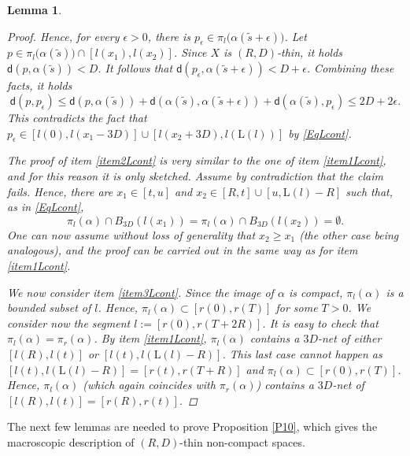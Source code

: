 \documentclass[10pt]{article}
\newtheorem{lemma}[thm]{Lemma}
\theoremstyle{definition}
\newcommand{\length}{\mathrm{L}}
\newcommand{\sd}{\mathsf{d}}
\begin{document}
\begin{lemma}
\begin{proof}
Hence, for every $\epsilon>0$, there is $p_\epsilon \in \pi_l\big(\alpha(\tilde{s}+\epsilon) \big)$.  Let $p \in \pi_l\big(\alpha(\tilde{s}) \big) \cap [l(x_1),l(x_2)]$. Since $X$ is $(R,D)$-thin, it holds $\sd(p,\alpha(\tilde{s}))<D$. It follows that $\sd(p_\epsilon,\alpha(\tilde{s}+\epsilon))<D+\epsilon$. Combining these facts, it holds
\[
\sd(p,p_\epsilon) \leq \sd(p,\alpha(\tilde{s}))+\sd(\alpha(\tilde{s}),\alpha(\tilde{s}+\epsilon))+\sd(\alpha(\tilde{s}),p_\epsilon) \leq 2D+2\epsilon.
\]
This contradicts the fact that $p_\epsilon \in [l(0),l(x_1-3D)] \cup [l(x_2+3D),l(\length(l))]$ by \eqref{EqLcont}. 

The proof of item \ref{item2Lcont} is very similar to the one of item \ref{item1Lcont}, and for this reason it is only sketched.
Assume by contradiction that the claim fails. Hence, there are $x_1 \in [t,u]$ and $x_2 \in [R,t] \cup [u,\length(l)-R]$ such that, as in \eqref{EqLcont},
            \begin{equation*} 
            \pi_l(\alpha) \cap B_{3D}(l(x_1))=\pi_l(\alpha) \cap B_{3D}(l(x_2))=\emptyset.
            \end{equation*}
One can now assume without loss of generality that $x_2 \geq x_1$ (the other case being analogous), and the proof can be carried out in the same way as for item \ref{item1Lcont}.

We now consider item \ref{item3Lcont}. Since the image of $\alpha$ is compact, $\pi_l(\alpha)$ is a bounded subset of $l$. Hence, $\pi_l(\alpha) \subset [r(0),r(T)]$ for some $T>0$. We consider now the segment $l:=[r(0),r(T+2R)]$. It is easy to check that $\pi_l(\alpha)=\pi_r(\alpha)$. By item \ref{item1Lcont}, $\pi_l(\alpha)$ contains a $3D$-net of either $[l(R),l(t)]$ or $[l(t),l(\length(l)-R)]$. This last case cannot happen as 
$[l(t),l(\length(l)-R)]=[r(t),r(T+R)]$ and $\pi_l(\alpha) \subset [r(0),r(T)]$. Hence, $\pi_l(\alpha)$ (which again coincides with $\pi_r(\alpha)$) contains a $3D$-net of $[l(R),l(t)]=[r(R),r(t)]$.
        \end{proof}
\end{lemma}

The next few lemmas are needed to prove Proposition \ref{P10}, which gives the macroscopic description of $(R,D)$-thin non-compact spaces. 
\end{document}
